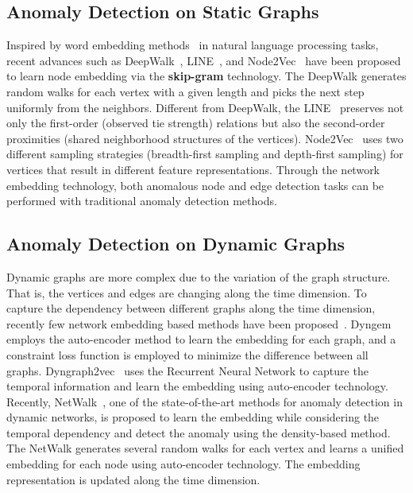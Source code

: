 \documentclass{article}
\newcommand{\zach}[1]{\textcolor{red}{(zach: #1)}}
\begin{document}
\subsection{Anomaly Detection on Static Graphs}
Inspired by word embedding methods~\cite{mikolov2013distributed} %
in natural language processing tasks, recent advances such as DeepWalk~\cite{perozzi2014deepwalk}, LINE~\cite{tang2015line}, and Node2Vec~\cite{grover2016node2vec} have been proposed to learn node embedding via the \textbf{skip-gram} technology. The DeepWalk generates random walks for each vertex with a given length and picks the next step uniformly from the neighbors. %
Different from DeepWalk, the LINE~\cite{tang2015line} preserves not only the first-order (observed tie strength) relations but also the second-order proximities (shared neighborhood structures of the vertices). Node2Vec~\cite{grover2016node2vec} uses two different sampling strategies (breadth-first sampling and depth-first sampling) for vertices that result in different feature representations. Through the network embedding technology, both anomalous node and edge detection tasks can be performed with traditional anomaly detection methods.

\subsection{Anomaly Detection on Dynamic Graphs}
Dynamic graphs are more complex due to the variation of the graph structure. That is, the vertices and edges are changing along the time dimension. %
To capture the dependency between different graphs along the time dimension, recently few network embedding based methods have been proposed~\cite{zhou2018dynamic}. Dyngem \cite{goyal2018dyngem} employs the auto-encoder method to learn the embedding for each graph, and a constraint loss function is employed to minimize the difference between all graphs. Dyngraph2vec~\cite{goyal2019dyngraph2vec} uses the Recurrent Neural Network to capture the temporal information and learn the embedding using auto-encoder technology. Recently, NetWalk~\cite{yu2018netwalk}, one of the state-of-the-art methods for anomaly detection in dynamic networks, is proposed to learn the embedding while considering the temporal dependency and detect the anomaly using the density-based method. The NetWalk generates several random walks for each vertex and learns a unified embedding for each node using auto-encoder technology. The embedding representation is updated along the time dimension. %
\end{document}
